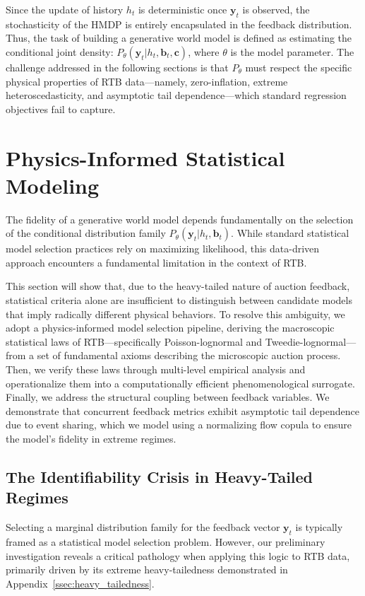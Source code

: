 \documentclass[sigconf, anonymous, review]{acmart}
\begin{document}
Since the update of history $h_t$ is deterministic once $\mathbf{y}_t$ is observed, the stochasticity of the HMDP is entirely encapsulated in the feedback distribution. Thus, the task of building a generative world model is defined as estimating the conditional joint density:
$
    P_{\theta}(\mathbf{y}_t | h_t, \mathbf{b}_t, \mathbf{c})
$, where $\theta$ is the model parameter.
The challenge addressed in the following sections is that $P_{\theta}$ must respect the specific physical properties of RTB data—namely, zero-inflation, extreme heteroscedasticity, and asymptotic tail dependence—which standard regression objectives fail to capture.

\section{Physics-Informed Statistical Modeling}

The fidelity of a generative world model depends fundamentally on the selection of the conditional distribution family $P_\theta(\mathbf{y}_t | h_t, \mathbf{b}_t)$. While standard statistical model selection practices rely on maximizing likelihood, this data-driven approach encounters a fundamental limitation in the context of RTB.

This section will show that, due to the heavy-tailed nature of auction feedback, statistical criteria alone are insufficient to distinguish between candidate models that imply radically different physical behaviors.
To resolve this ambiguity, we adopt a physics-informed model selection pipeline, deriving the macroscopic statistical laws of RTB—specifically Poisson-lognormal and Tweedie-lognormal—from a set of fundamental axioms describing the microscopic auction process.
Then, we verify these laws through multi-level empirical analysis and operationalize them into a computationally efficient phenomenological surrogate.
Finally, we address the structural coupling between feedback variables. We demonstrate that concurrent feedback metrics exhibit asymptotic tail dependence due to event sharing, which we model using a normalizing flow copula to ensure the model's fidelity in extreme regimes.

\subsection{The Identifiability Crisis in Heavy-Tailed Regimes}

Selecting a marginal distribution family for the feedback vector $\mathbf{y}_t$ is typically framed as a statistical model selection problem. However, our preliminary investigation reveals a critical pathology when applying this logic to RTB data, primarily driven by its extreme heavy-tailedness demonstrated in Appendix~\ref{ssec:heavy_tailedness}.
\end{document}
